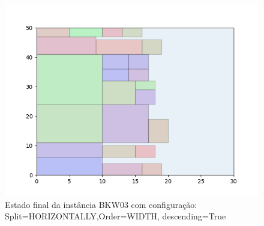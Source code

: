 \begin{figure}[H]
    \centering
    \caption[]{Estado final da instância BKW03 com configuração: Split=HORIZONTALLY,Order=WIDTH, descending=True}
    \label{fig:bkw03-horizontally-width-true}
    \includegraphics[scale=0.5]{output/figures/bkw/bkw03/horizontally/width/true/00}
\end{figure}